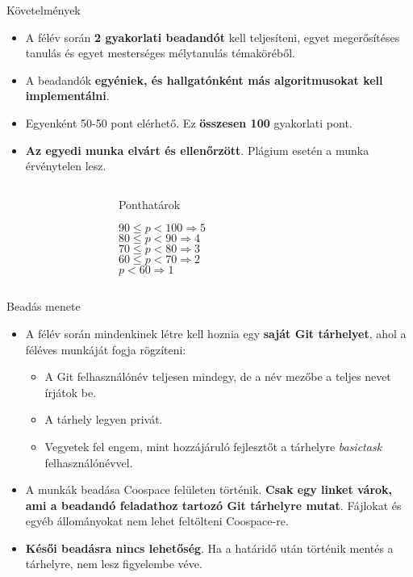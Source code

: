 \documentclass[english, aspectratio=169]{beamer}
\begin{document}
\begin{frame}{Követelmények}
\begin{itemize}
	\item A félév során \textbf{2 gyakorlati beadandót} kell teljesíteni, egyet megerősítéses tanulás és egyet mesterséges mélytanulás témaköréből. 
	\item A beadandók \textbf{egyéniek, és hallgatónként más algoritmusokat kell implementálni}.
	\item Egyenként 50-50 pont elérhető. Ez \textbf{összesen 100} gyakorlati pont. 
	\item \textbf{Az egyedi munka elvárt és ellenőrzött}. Plágium esetén a munka érvénytelen lesz. 
\end{itemize}
\par\smallskip
\begin{columns}
\begin{column}{.3\textwidth}
\end{column}
\begin{column}{.3\textwidth}
\begin{block}{\begin{center}Ponthatárok\end{center}}
\begin{center}
$90 \leq p < 100 \Rightarrow 5$\\
$80 \leq p < 90 \Rightarrow 4$\\
$70 \leq p < 80 \Rightarrow 3$\\
$60 \leq p < 70 \Rightarrow 2$\\
$p < 60 \Rightarrow 1$
\end{center}
\end{block}
\end{column}
\begin{column}{.3\textwidth}
\end{column}
\end{columns}
\end{frame}

\begin{frame}{Beadás menete}
\begin{itemize}
	\item A félév során mindenkinek létre kell hoznia egy \textbf{saját Git tárhelyet}, ahol a féléves munkáját fogja rögzíteni:
	\begin{itemize}
		\item A Git felhasználónév teljesen mindegy, de a név mezőbe a teljes nevet írjátok be. 
		\item A tárhely legyen privát. 
		\item Vegyetek fel engem, mint hozzájáruló fejlesztőt a tárhelyre \emph{basictask} felhasználónévvel. 
	\end{itemize}
	\item A munkák beadása Coospace felületen történik. \textbf{Csak egy linket várok, ami a beadandó feladathoz tartozó Git tárhelyre mutat}. Fájlokat és egyéb állományokat nem lehet feltölteni Coospace-re.
	\item \textbf{Késői beadásra nincs lehetőség}. Ha a határidő után történik mentés a tárhelyre, nem lesz figyelembe véve.
\end{itemize}
\end{frame}
\end{document}
